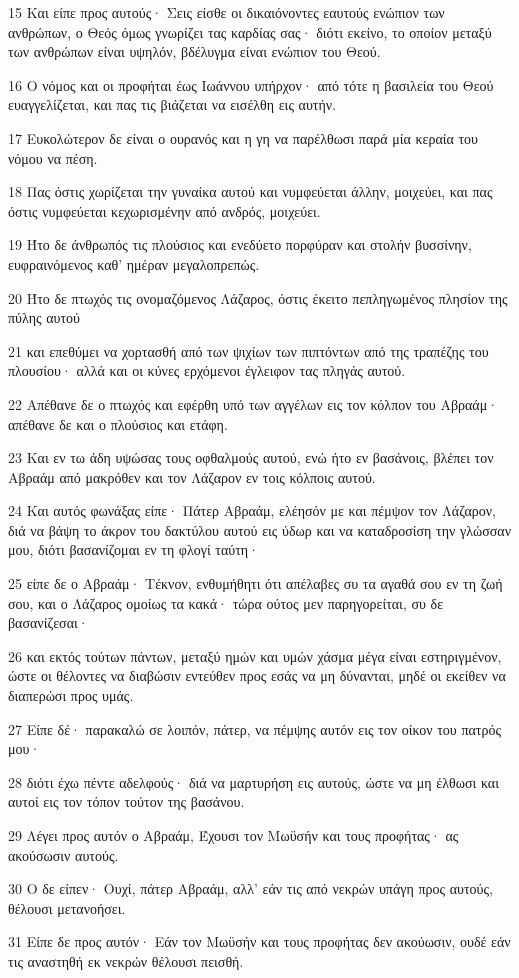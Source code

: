 \par 15 Και είπε προς αυτούς· Σεις είσθε οι δικαιόνοντες εαυτούς ενώπιον των ανθρώπων, ο Θεός όμως γνωρίζει τας καρδίας σας· διότι εκείνο, το οποίον μεταξύ των ανθρώπων είναι υψηλόν, βδέλυγμα είναι ενώπιον του Θεού.
\par 16 Ο νόμος και οι προφήται έως Ιωάννου υπήρχον· από τότε η βασιλεία του Θεού ευαγγελίζεται, και πας τις βιάζεται να εισέλθη εις αυτήν.
\par 17 Ευκολώτερον δε είναι ο ουρανός και η γη να παρέλθωσι παρά μία κεραία του νόμου να πέση.
\par 18 Πας όστις χωρίζεται την γυναίκα αυτού και νυμφεύεται άλλην, μοιχεύει, και πας όστις νυμφεύεται κεχωρισμένην από ανδρός, μοιχεύει.
\par 19 Ήτο δε άνθρωπός τις πλούσιος και ενεδύετο πορφύραν και στολήν βυσσίνην, ευφραινόμενος καθ' ημέραν μεγαλοπρεπώς.
\par 20 Ήτο δε πτωχός τις ονομαζόμενος Λάζαρος, όστις έκειτο πεπληγωμένος πλησίον της πύλης αυτού
\par 21 και επεθύμει να χορτασθή από των ψιχίων των πιπτόντων από της τραπέζης του πλουσίου· αλλά και οι κύνες ερχόμενοι έγλειφον τας πληγάς αυτού.
\par 22 Απέθανε δε ο πτωχός και εφέρθη υπό των αγγέλων εις τον κόλπον του Αβραάμ· απέθανε δε και ο πλούσιος και ετάφη.
\par 23 Και εν τω άδη υψώσας τους οφθαλμούς αυτού, ενώ ήτο εν βασάνοις, βλέπει τον Αβραάμ από μακρόθεν και τον Λάζαρον εν τοις κόλποις αυτού.
\par 24 Και αυτός φωνάξας είπε· Πάτερ Αβραάμ, ελέησόν με και πέμψον τον Λάζαρον, διά να βάψη το άκρον του δακτύλου αυτού εις ύδωρ και να καταδροσίση την γλώσσαν μου, διότι βασανίζομαι εν τη φλογί ταύτη·
\par 25 είπε δε ο Αβραάμ· Τέκνον, ενθυμήθητι ότι απέλαβες συ τα αγαθά σου εν τη ζωή σου, και ο Λάζαρος ομοίως τα κακά· τώρα ούτος μεν παρηγορείται, συ δε βασανίζεσαι·
\par 26 και εκτός τούτων πάντων, μεταξύ ημών και υμών χάσμα μέγα είναι εστηριγμένον, ώστε οι θέλοντες να διαβώσιν εντεύθεν προς εσάς να μη δύνανται, μηδέ οι εκείθεν να διαπερώσι προς υμάς.
\par 27 Είπε δέ· παρακαλώ σε λοιπόν, πάτερ, να πέμψης αυτόν εις τον οίκον του πατρός μου·
\par 28 διότι έχω πέντε αδελφούς· διά να μαρτυρήση εις αυτούς, ώστε να μη έλθωσι και αυτοί εις τον τόπον τούτον της βασάνου.
\par 29 Λέγει προς αυτόν ο Αβραάμ, Έχουσι τον Μωϋσήν και τους προφήτας· ας ακούσωσιν αυτούς.
\par 30 Ο δε είπεν· Ουχί, πάτερ Αβραάμ, αλλ' εάν τις από νεκρών υπάγη προς αυτούς, θέλουσι μετανοήσει.
\par 31 Είπε δε προς αυτόν· Εάν τον Μωϋσήν και τους προφήτας δεν ακούωσιν, ουδέ εάν τις αναστηθή εκ νεκρών θέλουσι πεισθή.

